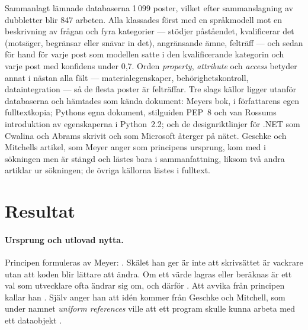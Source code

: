 Sammanlagt lämnade databaserna 1\,099 poster, vilket efter
sammanslagning av dubbletter blir 847 arbeten.  Alla klassades först
med en språkmodell mot en beskrivning av frågan och fyra kategorier ---
stödjer påståendet, kvalificerar det (motsäger, begränsar eller snävar
in det), angränsande ämne, felträff --- och sedan för hand för varje
post som modellen satte i den kvalificerande kategorin och varje post
med konfidens under 0,7.  Orden \emph{property}, \emph{attribute} och
\emph{access} betyder annat i nästan alla fält --- materialegenskaper,
behörighetskontroll, dataintegration --- så de flesta poster är
felträffar.  Tre slags källor ligger utanför databaserna och hämtades
som kända dokument: Meyers bok\autocite{Meyer1997OOSC}, i
författarens egen fulltextkopia; Pythons egna dokument, stilguiden
PEP~8\autocite{pep8} och van Rossums introduktion av egenskaperna i
Python~2.2\autocite{vanRossum2001Unifying}; och de
designriktlinjer för .NET som Cwalina och Abrams skrivit och som Microsoft
återger på nätet\autocite{Cwalina2008Properties}.  Geschke och Mitchells
artikel\autocite{GeschkeMitchell1975}, som Meyer anger som principens
ursprung, kom med i sökningen men är stängd och lästes bara i
sammanfattning, liksom två andra artiklar ur
sökningen\autocite{Weiher2013Polymorphic,Stucki2018Truly}; de övriga
källorna lästes i fulltext.

\section{Resultat}
\label{sec:egen-resultat}

\paragraph{Ursprung och utlovad nytta.}  Principen formuleras av Meyer:
.  Skälet
han ger är inte att skrivsättet är vackrare utan att koden blir lättare
att ändra.  Om ett värde lagras eller beräknas är ett val som
utvecklare ofta ändrar sig om, och därför
.  Att avvika från principen kallar han
.  Själv anger han att idén kommer från Geschke och
Mitchell\autocite[64]{Meyer1997OOSC}, som under namnet
\emph{uniform references} ville att ett program skulle kunna arbeta med
ett dataobjekt .

